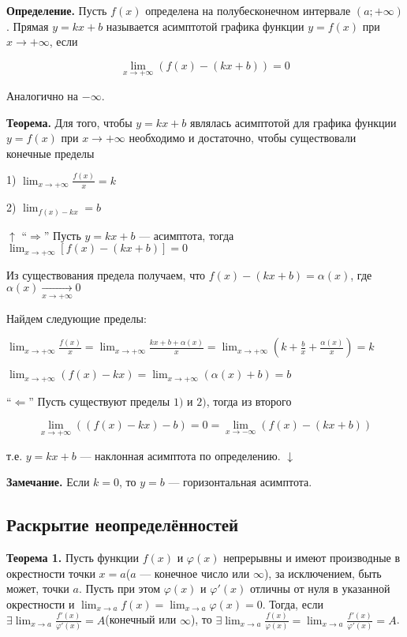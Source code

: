 \documentclass{article}
\begin{document}
    \textbf{Определение.} Пусть \(f(x)\) определена на полубесконечном интервале \((a; +\infty)\). Прямая \(y = kx + b\) называется асимптотой графика функции \(y = f(x)\) при \(x \to +\infty\), если
    
    \[\lim_{x \to +\infty} (f(x) - (kx+b)) = 0\]

    Аналогично на \(-\infty\).

    \textbf{Теорема.} Для того, чтобы \( y = kx + b \) являлась асимптотой для графика функции \( y = f(x) \) при \( x \to +\infty \) необходимо и достаточно, чтобы существовали конечные пределы
    
    1) \( \lim_{x \to +\infty} \frac{f(x)}{x} = k \)

    2) \( \lim_{f(x) - kx} = b \)

    \( \uparrow \) ``\( \Rightarrow \)'' Пусть \( y = kx + b \) --- асимптота, тогда \( \lim_{x \to +\infty}[f(x) - (kx + b)] = 0 \)

    Из существования предела получаем, что \( f(x) - (kx + b) = \alpha(x) \), где \( \alpha(x) \xrightarrow[x \to +\infty]{} 0 \)

    Найдем следующие пределы:

    \( \lim_{x \to +\infty} \frac{f(x)}{x} = \lim_{x \to +\infty} \frac{kx + b + \alpha(x)}{x} = \lim_{x \to +\infty}(k + \frac{b}{x} + \frac{\alpha(x)}{x}) = k \)

    \( \lim_{x \to +\infty} (f(x) - kx) = \lim_{x \to +\infty} (\alpha(x) + b) = b \)
    
    ``\(\Leftarrow\)'' Пусть существуют пределы \(1)\) и \(2)\), тогда из второго

    \[\lim_{x \to +\infty} ((f(x)-kx)-b) = 0 = \lim_{x \to -\infty} (f(x) - (kx+b))\]

    т.е. \(y = kx + b\) --- наклонная асимптота по определению. \(\downarrow\)

    \textbf{Замечание.} Если \(k=0\), то \(y=b\) --- горизонтальная асимптота.
    
    \subsection{Раскрытие неопределённостей}

    \textbf{Теорема 1.} Пусть функции \(f(x)\) и \(\varphi(x)\) непрерывны и имеют производные в окрестности точки \(x=a\)(\(a\) --- конечное число или \(\infty\)), за исключением, быть может, точки \(a\). Пусть при этом \(\varphi(x)\) и \(\varphi'(x)\) отличны от нуля в указанной окрестности и \(\lim_{x \to a} f(x) = \lim_{x \to a} \varphi(x) = 0\).
    Тогда, если \(\exists \lim_{x \to a} \frac{f'(x)}{\varphi'(x)} = A\)(конечный или \(\infty\)), то \(\exists \lim_{x \to a} \frac{f(x)}{\varphi(x)} = \lim_{x \to a} \frac{f'(x)}{\varphi'(x)} = A\).
\end{document}
